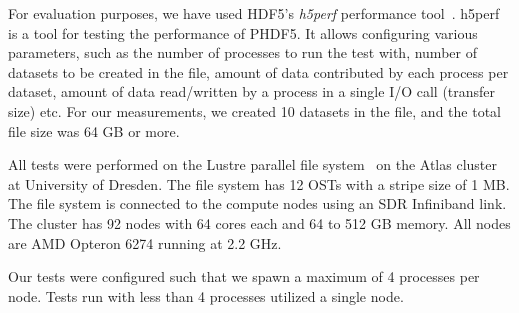 For evaluation purposes, we have used HDF5's \textit{h5perf} performance tool~\cite{h5perf}. h5perf is a tool for testing the performance of PHDF5. It allows configuring various parameters, such as the number of processes to run the test with, number of datasets to be created in the file, amount of data contributed by each process per dataset, amount of data read/written by a process in a single I/O call (transfer size) etc. For our measurements, we created 10 datasets in the file, and the total file size was 64 GB or more.

All tests were performed on the Lustre parallel file system~\cite{lustre} on the Atlas cluster at University of Dresden. The file system has 12 OSTs with a stripe size of 1 MB. The file system is connected to the compute nodes using an SDR Infiniband link. 
The cluster has 92 nodes with 64 cores each and 64 to 512 GB memory. All nodes are AMD Opteron 6274 running at 2.2 GHz.

Our tests were configured such that we spawn a maximum of 4 processes per node. Tests run with less than 4 processes utilized a single node. 

%


